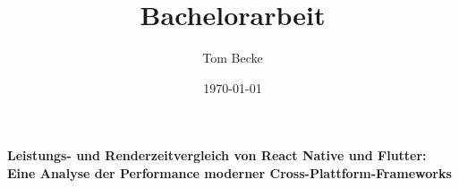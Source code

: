 \documentclass[a4paper,12pt]{article}
\title{Bachelorarbeit}
\author{Tom Becke}
\date{\today}
\begin{document}
\doublespacing

\maketitle

\begin{center}
    {\LARGE \textbf{Leistungs- und Renderzeitvergleich von React Native und Flutter: Eine Analyse der Performance moderner Cross-Plattform-Frameworks}}
\end{center}

\newpage

\tableofcontents

\newpage












\nocite{*}
\printbibliography[notkeyword=Quelle,title={Literaturverzeichnis},heading=subbibliography]
\end{document}
